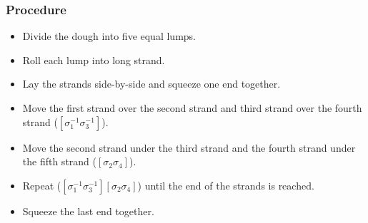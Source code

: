 \documentclass[10pt, openany]{book}
\begin{document}
\subsubsection{Procedure}
\begin{itemize}
  \item Divide the dough into five equal lumps.
  \item Roll each lump into long strand.
  \item Lay the strands side-by-side and squeeze one end together.
  \item Move the first strand over the second strand and third strand over the fourth strand ($[\sigma^{-1}_1 \sigma^{-1}_3]$).
  \item Move the second strand under the third strand and the fourth strand under the fifth strand ($[\sigma_2\sigma_4]$).
  \item Repeat ($[\sigma^{-1}_1 \sigma^{-1}_3][\sigma_2\sigma_4]$) until the end of the strands is reached.
  \item Squeeze the last end together.
\end{itemize}
\end{document}
